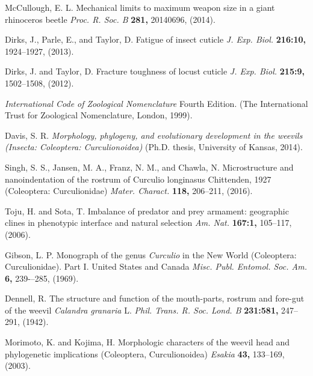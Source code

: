 \documentclass[twocolumn, linenumbers, superscriptaddress, nofootinbib]{revtex4-1}
\begin{document}
\begin{thebibliography}{50}
				McCullough, E. L.
				Mechanical limits to maximum weapon size in a giant rhinoceros beetle
				\textit{Proc. R. Soc. B}
				\textbf{281,}
				20140696,
				(2014).
			
				Dirks, J., Parle, E., and Taylor, D.
				Fatigue of insect cuticle
				\textit{J. Exp. Biol.}
				\textbf{216:10,}
				1924--1927,
				(2013).
			
				Dirks, J. and Taylor, D.
				Fracture toughness of locust cuticle
				\textit{J. Exp. Biol.}
				\textbf{215:9,}
				1502--1508,
				(2012).
				
				\textit{International Code of Zoological Nomenclature}
				Fourth Edition. 
				(The International Trust for Zoological Nomenclature,
				London,
				1999).
						
				Davis, S. R.
				\textit{Morphology, phylogeny, and evolutionary development in the weevils (Insecta: Coleoptera: Curculionoidea)}
				(Ph.D. thesis,
				University of Kansas,
				2014).			
			
				Singh, S. S., Jansen, M. A., Franz, N. M., and Chawla, N.
				Microstructure and nanoindentation of the rostrum of Curculio longinasus Chittenden, 1927 (Coleoptera: Curculionidae)
				\textit{Mater. Charact.}
				\textbf{118,}
				206--211,
				(2016).
			
				Toju, H. and Sota, T.
				Imbalance of predator and prey armament: geographic clines in phenotypic interface and natural selection
				\textit{Am. Nat.}
				\textbf{167:1,}
				105--117,
				(2006).
			
				Gibson, L. P.
				Monograph of the genus \textit{Curculio} in the New World (Coleoptera: Curculionidae). Part I. United States and Canada
				\textit{Misc. Publ. Entomol. Soc. Am.}
				\textbf{6,} 
				239-–285,
				(1969).
			
				Dennell, R.
				The structure and function of the mouth-parts, rostrum and fore-gut of the weevil \textit{ Calandra granaria} L.
				\textit{Phil. Trans. R. Soc. Lond. B}
				\textbf{231:581,}
				247--291,
				(1942).
			
				Morimoto, K. and Kojima, H.
				Morphologic characters of the weevil head and phylogenetic implications (Coleoptera, Curculionoidea)
				\textit{Esakia}
				\textbf{43,}
				133--169,
				(2003).
			

\end{thebibliography}
\end{document}
